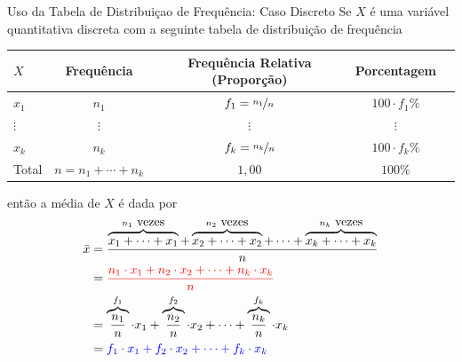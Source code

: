 \documentclass[8pt]{beamer}
\begin{document}
\begin{frame}{Uso da Tabela de Distribuiçao de Frequência: Caso Discreto}
 Se $X$ é uma variável quantitativa discreta com a seguinte tabela de distribuição de frequência
 
 {\tiny
  \begin{table}
   \centering
   \begin{tabular}{l|cccc}
    \toprule[0.05cm]
    $X$ & Frequência & Frequência Relativa (Proporção) & Porcentagem\\
    \midrule[0.05cm]
    $x_1$ & $n_1$ & $f_1=\nicefrac{n_1}{n}$ & $100\cdot f_1\%$\\ \hline
    $\vdots$ & $\vdots$ & $\vdots$ & $\vdots$ \\ \hline
    $x_k$ & $n_k$ & $f_k=\nicefrac{n_k}{n}$ & $100\cdot f_k\%$\\ \midrule[0.05cm]
    Total & $n=n_1+\cdots+n_k$ & $1,00$ & $100\%$\\ \bottomrule[0.05cm]
   \end{tabular}
  \end{table}
 }
 
 então a média de $X$ é dada por
 \begin{align*}
  \bar{x} &= \dfrac{ \overbrace{x_1+\cdots+x_1}^{n_1\mbox{ vezes}} + \overbrace{x_2+\cdots+x_2}^{n_2\mbox{ vezes}} + \cdots + \overbrace{x_k+\cdots+x_k}^{n_k\mbox{ vezes}} }{n}\\
  &= {\color{red} \dfrac{n_1 \cdot x_1 + n_2 \cdot x_2 + \cdots + n_k \cdot x_k}{n}} \\
  &= \overbrace{\dfrac{n_1}{n}}^{f_1} \cdot x_1 + \overbrace{\dfrac{n_2}{n}}^{f_2} \cdot x_2 + \cdots + \overbrace{\dfrac{n_k}{n}}^{f_k} \cdot x_k \\
  &= {\color{blue} f_1 \cdot x_1 + f_2 \cdot x_2 + \cdots + f_k \cdot x_k}
 \end{align*}

 
\end{frame}
\end{document}
